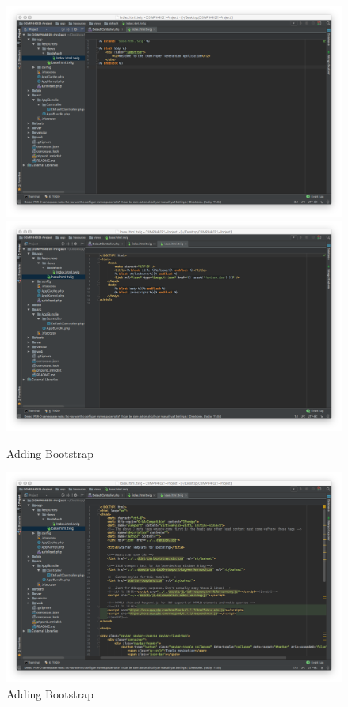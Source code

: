 \begin{figure}[htbp]
   \centering
   \includegraphics[width=400pt]{figures/index_html.png} %
   \includegraphics[width=400pt]{figures/base_html.png}
   \caption{Adding Bootstrap}
   \label{fig:Adding Bootstrap}
\end{figure}

\begin{figure}[htbp]
   \centering
   \includegraphics[width=400pt]{figures/bootstrap_html.png} %
   \caption{Adding Bootstrap}
   \label{fig:Adding Bootstrap}
\end{figure}

